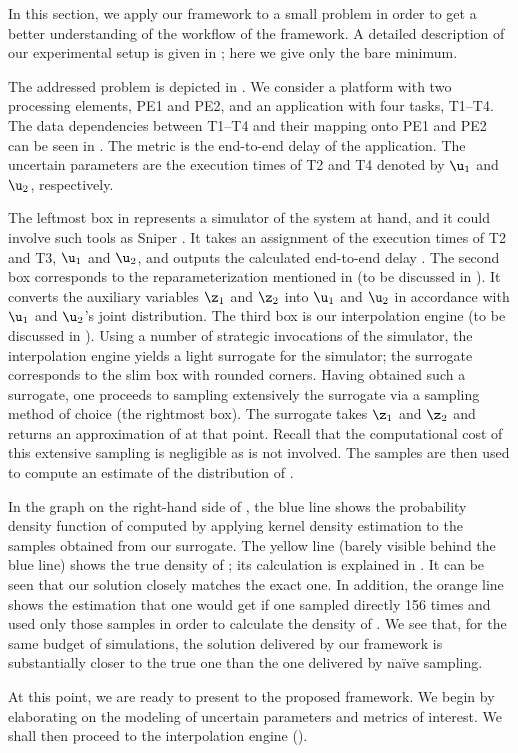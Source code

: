 In this section, we apply our framework to a small problem in order to get a
better understanding of the workflow of the framework. A detailed description of
our experimental setup is given in ; here we give only the
bare minimum.

The addressed problem is depicted in . We consider a platform with
two processing elements, PE1 and PE2, and an application with four tasks,
T1--T4. The data dependencies between T1--T4 and their mapping onto PE1 and PE2
can be seen in . The metric \g is the end-to-end delay of the
application. The uncertain parameters \vu are the execution times of T2 and T4
denoted by $\u_1$ and $\u_2$, respectively.

The leftmost box in  represents a simulator of the system at hand,
and it could involve such tools as Sniper \cite{carlson2011}. It takes an
assignment of the execution times of T2 and T3, $\u_1$ and $\u_2$, and outputs
the calculated end-to-end delay \g. The second box corresponds to the
reparameterization mentioned in  (to be discussed in
). It converts the auxiliary variables $\z_1$ and $\z_2$ into
$\u_1$ and $\u_2$ in accordance with $\u_1$ and $\u_2$'s joint distribution. The
third box is our interpolation engine (to be discussed in ).
Using a number of strategic invocations of the simulator, the interpolation
engine yields a light surrogate for the simulator; the surrogate corresponds to
the slim box with rounded corners. Having obtained such a surrogate, one
proceeds to sampling extensively the surrogate via a sampling method of choice
(the rightmost box). The surrogate takes $\z_1$ and $\z_2$ and returns an
approximation of \g at that point. Recall that the computational cost of this
extensive sampling is negligible as \g is not involved. The samples are then
used to compute an estimate of the distribution of \g.

In the graph on the right-hand side of , the blue line shows the
probability density function of \g computed by applying kernel density
estimation to the samples obtained from our surrogate. The yellow line (barely
visible behind the blue line) shows the true density of \g; its calculation is
explained in . It can be seen that our solution closely
matches the exact one. In addition, the orange line shows the estimation that
one would get if one sampled \g directly 156 times and used only those samples
in order to calculate the density of \g. We see that, for the same budget of
simulations, the solution delivered by our framework is substantially closer to
the true one than the one delivered by na\"{i}ve sampling.

At this point, we are ready to present to the proposed framework. We begin by
elaborating on the modeling of uncertain parameters and metrics of interest. We
shall then proceed to the interpolation engine ().

